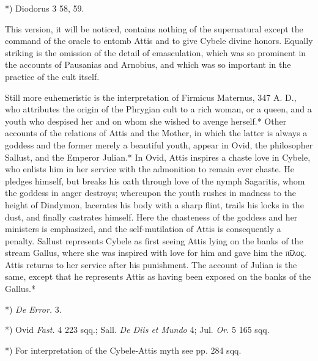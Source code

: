 \documentclass[a4paper, 11pt, oneside, polutonikogreek, english]{article}
\begin{document}
*) Diodorus 3 58, 59.

This version, it will be noticed, contains nothing of the supernatural except the command of the oracle to entomb Attis and to give Cybele divine honors. Equally striking is the omission of the detail of emasculation, which was so prominent in the accounts of Pausanias and Arnobius, and which was so important in the practice of the cult itself.

Still more euhemeristic is the interpretation of Firmicus Maternus, 347 A. D., who attributes the origin of the Phrygian cult to a rich woman, or a queen, and a youth who despised her and on whom she wished to avenge herself.* Other accounts of the relations of Attis and the Mother, in which the latter is always a goddess and the former merely a beautiful youth, appear in Ovid, the philosopher Sallust, and the Emperor Julian.* In Ovid, Attis inspires a chaste love in Cybele, who enlists him in her service with the admonition to remain ever chaste. He pledges himself, but breaks his oath through love of the nymph Sagaritis, whom the goddess in anger destroys; whereupon the youth rushes in madness to the height of Dindymon, lacerates his body with a sharp flint, trails his locks in the dust, and finally castrates himself. Here the chasteness of the goddess and her ministers is emphasized, and the self-mutilation of Attis is consequently a penalty. Sallust represents Cybele as first seeing Attis lying on the banks of the stream Gallus, where she was inspired with love for him and gave him the πῐλος. Attis returns to her service after his punishment. The account of Julian is the same, except that he represents Attis as having been exposed on the banks of the Gallus.*

*) \emph{De Error.} 3.

*) Ovid \emph{Fast.} 4 223 sqq.; Sall. \emph{De Diis et Mundo} 4; Jul. \emph{Or.} 5 165 sqq.

*) For interpretation of the Cybele-Attis myth see pp. 284 sqq.
\end{document}
